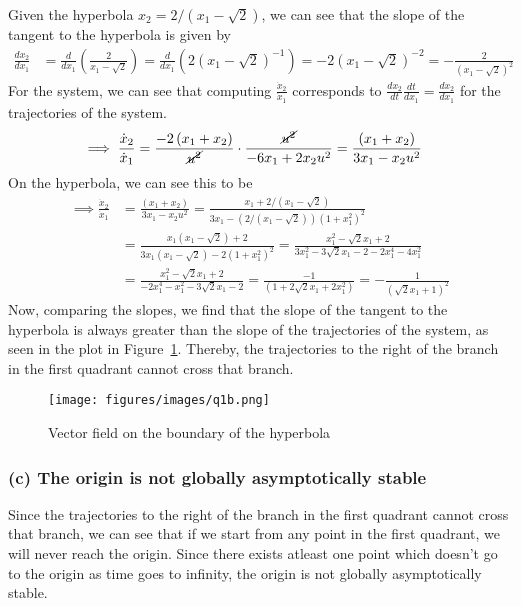 Given the hyperbola \( x_2 = 2 / (x_1 - \sqrt{2}) \), we can see that the slope of the tangent to the hyperbola is given by
\begin{align*}
    \frac{d x_2}{d x_1}
     & =
    \frac{d}{d x_1} \left( \frac{2}{x_1 - \sqrt{2}} \right)
    =
    \frac{d}{d x_1} \left( 2 (x_1 - \sqrt{2})^{-1} \right)
    =
    -2 (x_1 - \sqrt{2})^{-2}
    =
    -\frac{2}{(x_1 - \sqrt{2})^2}
\end{align*}
For the system, we can see that computing \( \frac{\dot{x}_2}{\dot{x}_1} \) corresponds to \( \frac{dx_2}{dt} \frac{dt}{d x_1} = \frac{dx_2}{d x_1} \) for the trajectories of the system.
\begin{align*}
    \implies
    \frac{\dot{x}_2}{\dot{x}_1}
     & =
    \frac{-2\left(x_{1}+x_{2}\right)}{\cancel{u^{2}}}
    \cdot
    \frac{\cancel{u^{2}}}{-6 x_{1}+2 x_{2} u^2}
    =
    \frac{\left(x_{1}+x_{2}\right)}{3 x_{1} - x_{2} u^2}
\end{align*}
On the hyperbola, we can see this to be
\begin{align*}
    \implies
    \frac{\dot{x}_2}{\dot{x}_1}
     & =
    \frac{\left(x_{1}+x_{2}\right)}{3 x_{1} - x_{2} u^2}
    =
    \frac{x_1 + 2 / (x_1 - \sqrt{2})}{3 x_1 - \left( 2 / (x_1 - \sqrt{2}) \right) (1+x_1^2)^2}
    \\ & =
    \frac{x_1 (x_1 - \sqrt{2}) + 2}{3 x_1 (x_1 - \sqrt{2}) - 2 (1+x_1^2)^2}
    =
    \frac{x_1^2 - \sqrt{2} x_1 + 2}{3 x_1^2 - 3 \sqrt{2} x_1 - 2 - 2 x_1^4 - 4 x_1^2}
    \\ & =
    \frac{x_1^2 - \sqrt{2} x_1 + 2}{-2 x_1^4 - x_1^2 - 3 \sqrt{2} x_1 - 2}
    =
    \frac{-1}{\left(1+2 \sqrt{2} x_{1}+2 x_{1}^{2}\right)}
    =
    -\frac{1}{(\sqrt{2} x_{1}+ 1)^2}
\end{align*}
Now, comparing the slopes, we find that the slope of the tangent to the hyperbola is always greater than the slope of the trajectories of the system, as seen in the plot in Figure~\ref{fig:q1b}.
Thereby, the trajectories to the right of the branch in the first quadrant cannot cross that branch.

\begin{figure}[htb]
    \centering
    \texttt{[image: figures/images/q1b.png]}
    \caption{
        Vector field on the boundary of the hyperbola
    }\label{fig:q1b}
\end{figure}

\newpage
\subsubsection*{(c) The origin is not globally asymptotically stable}

Since the trajectories to the right of the branch in the first quadrant cannot cross that branch, we can see that if we start from any point in the first quadrant, we will never reach the origin.
Since there exists atleast one point which doesn't go to the origin as time goes to infinity, the origin is not globally asymptotically stable.
